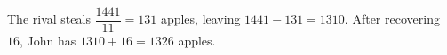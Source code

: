 The rival steals $\dfrac{1441}{11}=131$ apples, leaving $1441-131=1310$. After recovering $16$, John has $1310+16=\boxed{1326}$ apples.
